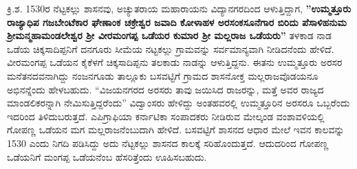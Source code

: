 ಕ್ರಿ.ಶ. 1530ರ ನೆಟ್ಟಕಲ್ಲು ಶಾಸನವು, ಅಚ್ಯುತರಾಯ ಮಹಾರಾಯನು ವಿದ್ಯಾನಗರದಿಂದ ಆಳುತ್ತಿದ್ದಾಗ, \textbf{''ಉಮ್ಮತ್ತೂರು ರಾಜ್ಯಾಧಿಪ ಗಜಬೇಂಟೆಕಾರ ಘೇಣಾಂಕ ಚಕ್ರೇಶ್ವರ ಜವಾದಿ ಕೋಳಾಹಳ ಅರಸಂಕಸೂನೆಗಾರ ಬಿರಿದು ಪೆಸಾಳಿಹನುಮ ಶ‍್ರೀಮನ್ಮಹಾಮಂಡಲೇಶ್ವರ ಶ‍್ರೀ ವೀರಮಂಗಪ್ಪ ಒಡೆಯರ ಕುಮಾರ ಶ‍್ರೀ ಮಲ್ಲರಾಜ ಒಡೆಯರು''} ತಳಕಾಡ ನಾಡ ಒಡೆಯ ಚಿಕ್ಕಸಾದಿಪ್ಪನಿಗೆ ದನಗೂರು ಸೀಮೆಯ ನಟ್ಟಕಲ್ಲು ಗ್ರಾಮವನ್ನು ಸರ್ವಮಾನ್ಯವಾಗಿ ನೀಡಿದನೆಂದು ಹೇಳಿದೆ. ವೀರಮಂಗಪ್ಪ ಒಡೆಯನ\textbf{ } ಕೈಕೆಳಗೆ ಚಿಕ್ಕಸಾದಿಪ್ಪನು ತಲಕಾಡು ನಾಡನ್ನು ಆಳುತ್ತಿದ್ದನು. ಈತನು ಉಮ್ಮತ್ತೂರು ಅರಸರ ಮನೆತನದವನಾಗಿದ್ದು ನಂಜನಗೂಡು ತಾಲ್ಲೂಕು ಬಸವಟ್ಟಿಗೆ ಗ್ರಾಮದ ಶಾಸನೋಕ್ತ ಮಲ್ಲರಾಜವೊಡಯನೂ ಅಭಿನನ್ನೆಂದು ಹೇಳಬಹುದು. “ವಿಜಯನಗರದ ಅರಸರು ತಾವು ಜಯಿಸಿದ ರಾಜರನ್ನು, ಮತ್ತೆ ಅವರ ರಾಜ್ಯದ ಮಾಂಡಲಿಕರನ್ನಾಗಿ ನೇಮಿಸುತ್ತಿದ್ದರೆಂದು” ವಿದ್ವಾಂಸರು ಹೇಳಿದ್ದು ಅಂತಹವರಲ್ಲಿ ಉಮ್ಮತ್ತೂರಿನ ಅರಸರೂ ಒಬ್ಬರೆಂದು ಇದರಿಂದ ತಿಳಿದು\-ಬರುತ್ತದೆ.\textbf{ }ಎಪಿಗ್ರಾಫಿಯಾ ಕರ್ನಾಟಿಕಾ ಸಂಪಾದಕರು ನೀಡಿರುವ ಮೇಲ್ಕಂಡ ವಂಶಾವಳಿಯಲ್ಲಿ ಗೋಪಣ್ಣ ಒಡೆಯನ ಮಗ ಮಲ್ಲರಾಜ\-ನೆಂಬುದಾಗಿ ಹೇಳಿದೆ. ಬಸವಟ್ಟಿಗೆ ಶಾಸನದ ಆಧಾರ ಮೇಲೆ ಇವನ ಕಾಲವನ್ನು 1530 ಎಂದು ನಿಗದಿ ಪಡಿಸಿದ್ದು ಅದು ನೆಟ್ಟಕಲ್ಲು ಶಾಸನದ ಕಾಲಕ್ಕೆ ಸರಿಹೊಂದುತ್ತದೆ. ಆದುದರಿಂದ ಗೋಪಣ್ಣ ಒಡೆಯನಿಗೆ ಮಂಗಪ್ಪ ಒಡೆಯನೆಂಬ ಹೆಸರಿತ್ತೆಂದು ಊಹಿಸಬಹುದು. 

